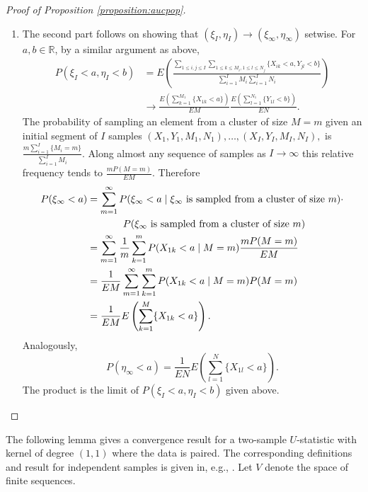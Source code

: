 \documentclass[12pt]{article}
\newcommand{\I}{I}
\newcommand{\E}{E}
\renewcommand{\P}{P}
\newcommand{\seqspace}{V}%
\newcommand{\comment}[1]{
  \iftoggle{commenttoggle}{
    {\normalsize{\color{red}{ #1}}\normalsize}
  }
  {}
}
\begin{document}
\begin{proof}[Proof of Proposition \ref{proposition:aucpop}]
\begin{enumerate}
    \item The second part follows on showing that $(\xi_\I,\eta_\I)\to (\xi_\infty,\eta_\infty)$ setwise. %
      For $a,b\in\mathbb{R}$, by a similar argument as above,
      \begin{align}
        \P(\xi_\I<a,\eta_\I<b) &=\E\left(\frac
                                     {\sum_{1\le i,j\le\I}\sum_{1\le k\le M_i,1\le l\le N_j}\{X_{ik}<a,Y_{jl}<b\}}
                                 {\sum_{i=1}^\I M_i \sum_{i=1}^\I N_i} \right)\\
                               &\to \frac{\E\left(\sum_{k=1}^{M_1}\{X_{1k}<a\}\right)}{\E M}
                                 \frac{\E\left(\sum_{l=1}^{N_1}\{Y_{1l}<b\}\right)}{\E N}.                         
      \end{align}
      The probability of sampling an element from a cluster of size
      $M=m$ given an initial segment of $\I$ samples
      $(X_1,Y_1,M_1,N_1),\ldots,(X_\I,Y_\I,M_\I,N_\I),$ is
      $\frac{m\sum_{i=1}^\I\{M_i=m\}}{\sum_{i=1}^\I M_i}$. Along almost
      any sequence of samples as $\I\to\infty$ this relative frequency
      tends to $\frac{m\P(M=m)}{\E M}$. Therefore
      \begin{align}
        \P(\xi_\infty < a) &= \sum_{m=1}^\infty\P(\xi_\infty < a \mid \xi_\infty\text{ is sampled from a cluster of size }m)\cdot\\
        &\hspace{.5in}\P(\xi_\infty\text{ is sampled from a cluster of size }m)\\
                           &= \sum_{m=1}^\infty\frac{1}{m}\sum_{k=1}^m\P(X_{1k}<a\mid M=m)\frac{m\P(M=m)}{\E M}\\
                           &=\frac{1}{\E M}\sum_{m=1}^\infty\sum_{k=1}^m\P(X_{1k}<a\mid M=m)\P(M=m)\\
        &=\frac{1}{\E M}\E\left(\sum_{k=1}^M\{X_{1k}<a\}\right).
      \end{align}
      Analogously,
      $$
      \P(\eta_\infty < a)=\frac{1}{\E N}\E\left(\sum_{l=1}^N\{X_{1l}<a\}\right).
      $$
      The product is the limit of
      $\P(\xi_\I<a,\eta_\I<b)$ given above.
    \end{enumerate}
  \end{proof}
    The following lemma gives a convergence result for a two-sample $U$-statistic with kernel of degree $(1,1)$ where the data is paired. The corresponding definitions and result for independent samples is given in, e.g., \cite{lee2019}. Let $\seqspace$ denote the space of finite sequences.%
\end{document}
